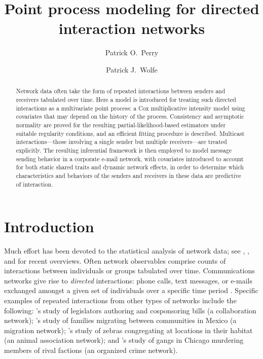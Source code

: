 \documentclass[final]{statsoc}
\title[Point Process Modeling for Directed Interaction Networks]{%
    Point process modeling for directed interaction networks
}
\author[P.\ O.\ Perry]{%
    Patrick O.\ Perry
}
\author[P.\ J.\ Wolfe]{%
    Patrick J.\ Wolfe
}
\begin{document}

\begin{abstract}
Network data often take the form of repeated interactions between senders
and receivers tabulated over time.  Here a model is introduced for treating such directed interactions as a
multivariate point process: a Cox multiplicative intensity model using
covariates that may depend on the history of the process.
Consistency and asymptotic normality are proved for the resulting
partial-likelihood-based estimators under suitable regularity
conditions, and an efficient fitting procedure is described.
Multicast interactions---those involving a single sender
but multiple receivers---are treated explicitly.
The resulting inferential framework is then employed to model message sending behavior in a corporate e-mail network, with covariates introduced to account for both static shared traits and dynamic network effects, in order to determine which characteristics and behaviors of the senders and receivers in these data are predictive of interaction.


\end{abstract}


\section{Introduction}
\label{S:introduction}

Much effort has been devoted to the statistical analysis of network data;
see \citet{jackson2008social}, \citet{goldenberg2009survey}, and \citet{kolaczyk2009statistical}
for recent overviews.  Often network observables comprise counts of interactions
between individuals or groups tabulated over time.  Communications networks
give rise to \emph{directed} interactions: phone calls, text messages, or
e-mails exchanged amongst a given set of individuals over a specific time
period \citep{tyler2005email,eagle2006reality}.  Specific examples of repeated
interactions from other types of networks include the following:
's \citeyearpar{fowler2006connecting}
study of legislators authoring and cosponsoring bills (a collaboration
network);
's \citeyearpar{mckenzie2007network} study
of families migrating between communities in Mexico (a migration network);
's \citeyearpar{sundaresan2007network}
study of zebras congregating at locations in
their habitat (an animal association network);
and 's \citeyearpar{papachristos2009murder}
study of gangs in Chicago murdering members of rival factions (an organized
crime network).
\end{document}

